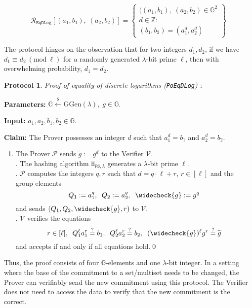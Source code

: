 \documentclass[11pt, lettersize, notitlepage, leqno, footskip=0.6cm]{article}
\newcommand{\ttt}{\texttt}
\newcommand{\wti}{\widetilde}
\newcommand{\mc}{\mathcal}
\newcommand{\mb}{\mathbb}
\newcommand{\mr}{\mathrm}
\newcommand{\lam}{\lambda}
\newcommand{\lamb}{\lambda}
\newcommand{\weck}{\widecheck}
\newcommand{\vs}{\vspace{-0.15cm}}
\newcommand{\noin}{\noindent}
\newcommand{\op}{overwhelming probability}
\newcommand{\sta}{\stackrel{?}{=}}
\newcommand{\Mod}[1]{\ (\mathrm{mod}\ #1)}
\newtheorem{Prot}[Thm]{Protocol}
\numberwithin{equation}{section}
\begin{document}
\[
  \mc{R}_{\ttt{EqDLog}}[(a_1, b_1),\;(a_2,b_2)] = \left\{\begin{array}{l}
    ((a_1, b_1),\; (a_2,b_2)\in\mb{G}^2\\
    d\in\mb{Z}: \\
    (b_1,b_2) = (a_1^d,a_2^d)
  \end{array}\right\}
\] \vspace{0.1cm}

\noin The protocol hinges on the observation that for two integers $d_1,d_2$, if we have $d_1\equiv d_2\Mod{\ell}$ for a randomly generated $\lam$-bit prime $\ell$, then with \op, $d_1= d_2$.

\vspace{0.15cm}


\begin{Prot}\label{EqDLog} \normalfont \textit{Proof of equality of discrete logarithms} (\verb|PoEqDLog|) :\end{Prot} \vspace{-0.3cm}

\noin \textbf{Parameters:} $\mb{G}\xleftarrow{\$} \mr{GGen}(\lamb), \; g\in \mb{G}$.

\noin \textbf{Input:} $a_1, a_2, b_1, b_2 \in \mb{G}$.

\noin \textbf{Claim:} The Prover possesses an integer $d$ such that $a_1^d = b_1$ and $a_2^d = b_2$.

\begin{enumerate}[wide, labelwidth=!, labelindent=0pt]\vs \item The Prover $\mc{P}$ sends $\wti{g} := g^d$ to the Verifier $\mc{V}$.\\
\noin 2. The hashing algorithm $\ttt{H}_{\ttt{FS},\lam}$ generates a $\lamb$-bit prime $\ell$. \\
\noin 3. $\mc{P}$ computes the integers $q, r$ such that $d = q \cdot \ell+r$, $r\in [\ell]$ and the group elements \vs $$Q_1:= a_1^q,\;\; Q_2:= a_2^q,\;\; \weck{g}:= g^q\vs $$ and sends $(Q_1, Q_2, \weck{g}, r)$ to $\mc{V}$. \\
\noin 4. $\mc{V}$ verifies the equations \vs $$r\in [\ell],\;\;Q_1^{\ell}a_1^r \sta  b_1, \;\; Q_2^{\ell}a_2^r \sta  b_2, \;\; (\weck{g})^{\ell}g^r \sta \wti{g} \vs $$ and accepts if and only if all equations hold.\qed \end{enumerate}

\noin Thus, the proof consists of four $\mb{G}$-elements and one $\lam$-bit integer. In a setting where the base of the commitment to a set/multiset needs to be changed, the Prover can verifiably send the new commitment using this protocol. The Verifier does not need to access the data to verify that the new commitment is the correct. 
\end{document}
